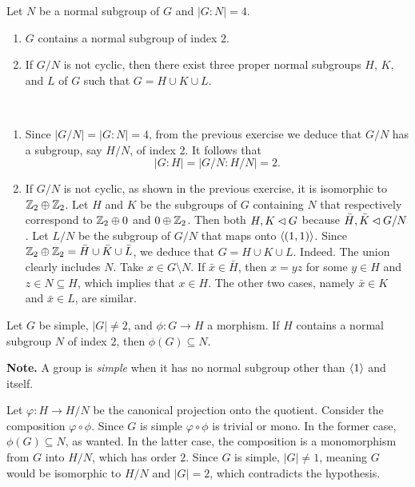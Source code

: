 \begin{exr}
    Let\/ $N$ be a normal subgroup of\/ $G$ and\/ $|G : N| = 4$.
    \begin{enumerate}[\upshape a)]
        \item $G$ contains a normal subgroup of index\/ $2$.
        \item If\/ $G/N$ is not cyclic, then there exist three proper normal subgroups\/ $H$, $K$, and\/ $L$ of\/ $G$ such that\/ $G=H\cup K\cup L$.
    \end{enumerate}
\end{exr}

\begin{solution}${}$
\begin{enumerate}[\upshape a)]
    \item Since $|G/N|=|G:N|=4$, from the previous exercise we deduce that $G/N$ has a subgroup, say $H/N$, of index $2$. It follows that
    $$
        |G:H|=|G/N:H/N|=2.
    $$

    \item If $G/N$ is not cyclic, as shown in the previous exercise, it is isomorphic to $\mathbb{Z}_2\oplus\mathbb{Z}_2$. Let $H$ and $K$ be the subgroups of $G$ containing $N$ that respectively correspond to $\mathbb{Z}_2\oplus 0$ and $0\oplus\mathbb{Z}_2$. Then both $H,K\lhd G$ because $\bar H,\bar K\lhd G/N$. Let $L/N$ be the subgroup of $G/N$ that maps onto $\langle(1,1)\rangle$. Since $\mathbb{Z}_2\oplus\mathbb{Z}_2=\bar H\cup\bar K\cup\bar L$, we deduce that $G=H\cup K\cup L$. Indeed. The union clearly includes $N$. Take $x\in G\setminus N$. If $\bar x\in\bar H$, then $x=yz$ for some $y\in H$ and $z\in N\subseteq H$, which implies that $x\in H$. The other two cases, namely $\bar x\in K$ and $\bar x\in L$, are similar.
\end{enumerate}
\end{solution}

\begin{exr}\label{exr:simple-group-mention}
    Let\/ $G$ be simple, $|G| \ne 2$, and\/ $\phi\colon G\to H$ a morphism. If\/ $H$ contains a normal subgroup\/ $N$ of index\/ $2$, then\/ $\phi(G) \subseteq N$.

    \textrm{\upshape\textbf{Note.} A group is \textsl{simple\/} when it has no normal subgroup other than $\langle1\rangle$ and itself.}
\end{exr}

\begin{solution}
    Let $\varphi\colon H\to H/N$ be the canonical projection onto the quotient. Consider the composition $\varphi\circ\phi$. Since $G$ is simple $\varphi\circ\phi$ is trivial or mono. In the former case, $\phi(G)\subseteq N$, as wanted. In the latter case, the composition is a monomorphism from $G$ into $H/N$, which has order $2$. Since $G$ is simple, $|G| \ne 1$, meaning $G$ would be isomorphic to $H/N$ and $|G|=2$, which contradicts the hypothesis.
\end{solution}


